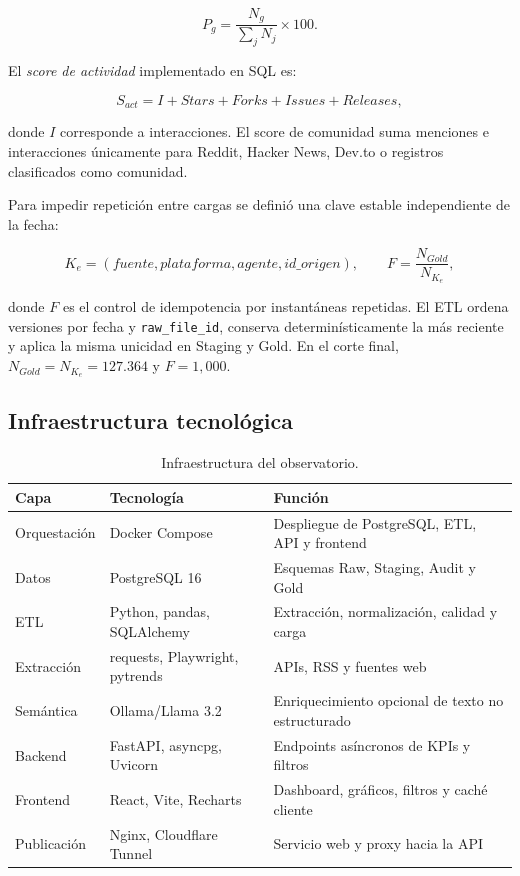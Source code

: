 \documentclass[12pt,a4paper]{article}
\newcommand{\pathcode}[1]{\begingroup\small\ttfamily\nolinkurl{#1}\endgroup}
\begin{document}
\begin{equation}
P_g = \frac{N_g}{\sum_j N_j}\times 100.
\end{equation}

El \emph{score de actividad} implementado en SQL es:

\begin{equation}
S_{act}=I+Stars+Forks+Issues+Releases,
\end{equation}

donde $I$ corresponde a interacciones. El score de comunidad suma menciones e interacciones únicamente para Reddit, Hacker News, Dev.to o registros clasificados como comunidad.

Para impedir repetición entre cargas se definió una clave estable independiente de la fecha:

\begin{equation}
K_e=(fuente,plataforma,agente,id\_origen),
\qquad
F=\frac{N_{Gold}}{N_{K_e}},
\end{equation}

donde $F$ es el control de idempotencia por instantáneas repetidas. El ETL ordena versiones por fecha y \pathcode{raw_file_id}, conserva determinísticamente la más reciente y aplica la misma unicidad en Staging y Gold. En el corte final, $N_{Gold}=N_{K_e}=127.364$ y $F=1,000$.

\subsection{Infraestructura tecnológica}

\begin{table}[H]
\centering
\small
{}
\begin{tabularx}{\textwidth}{P{3.2cm} P{3.5cm} Y}
\toprule
{}
\textbf{Capa} & \textbf{Tecnología} & \textbf{Función} \\
\midrule
Orquestación & Docker Compose & Despliegue de PostgreSQL, ETL, API y frontend \\
Datos & PostgreSQL 16 & Esquemas Raw, Staging, Audit y Gold \\
ETL & Python, pandas, SQLAlchemy & Extracción, normalización, calidad y carga \\
Extracción & requests, Playwright, pytrends & APIs, RSS y fuentes web \\
Semántica & Ollama/Llama 3.2 & Enriquecimiento opcional de texto no estructurado \\
Backend & FastAPI, asyncpg, Uvicorn & Endpoints asíncronos de KPIs y filtros \\
Frontend & React, Vite, Recharts & Dashboard, gráficos, filtros y caché cliente \\
Publicación & Nginx, Cloudflare Tunnel & Servicio web y proxy hacia la API \\
\bottomrule
\end{tabularx}
\caption{Infraestructura del observatorio.}
\end{table}
\end{document}
